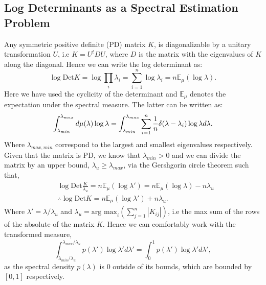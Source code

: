 \documentclass[letterpaper]{article} %
\begin{document}
\subsection{Log Determinants as a Spectral Estimation Problem}
Any symmetric positive definite (PD) matrix $K$, is diagonalizable by a unitary transformation $U$, i.e $K = U^{t}DU$, where $D$ is the matrix with the eigenvalues of $K$ along the diagonal. Hence we can write the log determinant as:
\begin{equation}
\log \text{Det} K = \log \prod_{i}\lambda_{i} = \sum_{i=1}^{n}\log\lambda_{i} = n\mathbb{E}_{\mu}(\log \lambda).
\end{equation} 
Here we have used the cyclicity of the determinant and $\mathbb{E}_{\mu}$ denotes the expectation under the spectral measure. The latter can be written as:
\begin{equation}
\label{eq:spectrallog}
 \int_{\lambda_{min}}^{\lambda_{max}}d\mu(\lambda)\log \lambda  \\  = \int_{\lambda_{min}}^{\lambda_{max}}\sum_{i=1}^{n}\frac{1}{n}\delta(\lambda-\lambda_{i})\log \lambda d\lambda.
\end{equation}
Where $\lambda_{max,min}$ correspond to the largest and smallest eigenvalues respectively. Given that the matrix is PD, we know that $\lambda_{min}>0$ and we can divide the matrix by an upper bound, $\lambda_{u} \geq \lambda_{max}$, via the Gershgorin circle theorem \cite{gershgorin1931uber} such that,
\begin{equation}
\begin{aligned}
& \log \text{Det} \frac{K}{\lambda_{u}} =  n\mathbb{E}_{\mu}(\log \lambda') =  n\mathbb{E}_{\mu}(\log \lambda) -  n\lambda_{u}\\
& \therefore \log \text{Det} K = n\mathbb{E}_{\mu}(\log \lambda') + n\lambda_{u}.
\end{aligned}
\end{equation}
Where $\lambda' = \lambda/\lambda_{u}$ and $\lambda_{u} = \text{arg max}_{i}(\sum_{j=1}^{n}|K_{ij}|)$, i.e the max sum of the rows of the absolute of the matrix $K$. Hence we can comfortably work with the transformed measure,
\begin{equation}
\int_{\lambda_{min}/\lambda_{u}}^{\lambda_{max}/\lambda_{u}}p(\lambda')\log \lambda' d\lambda' = \int_{0}^{1}p(\lambda')\log \lambda' d\lambda',
\end{equation}
as the spectral density $p(\lambda)$ is $0$ outside of its bounds, which are bounded by $[0,1]$ respectively.
\end{document}
